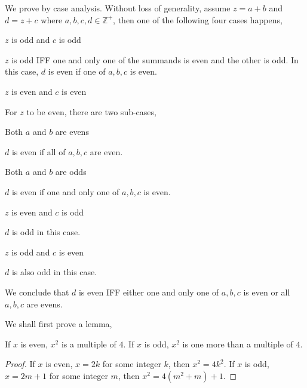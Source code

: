 \begin{pr}\leavevmode
    \begin{enumerate}[label=\textbf{(\alph*)}]
        \item We prove by case analysis. Without loss of generality, assume $z = a + b$
        and $d = z + c$ where $a,b,c,d \in \mathbb{Z}^{+}$, then
        one of the following four cases happens,

        \begin{casesp}
            \item $z$ is odd and $c$ is odd
            
            $z$ is odd IFF one and only one of the summands is even and the other is odd.
            In this case, $d$ is even if one of $a,b,c$ is even.

            \item $z$ is even and $c$ is even
            
            For $z$ to be even, there are two sub-cases,

            \begin{casesp}
                \item Both $a$ and $b$ are evens
                
                $d$ is even if all of $a,b,c$ are even.
                \item Both $a$ and $b$ are odds
                
                $d$ is even if one and only one of $a,b,c$ is even.
            \end{casesp}

            \item $z$ is even and $c$ is odd
            
            $d$ is odd in this case.

            \item $z$ is odd and $c$ is even
            
            $d$ is also odd in this case.
        \end{casesp}

        We conclude that $d$ is even IFF either one and only one of $a,b,c$
        is even or all $a,b,c$ are evens.

        \item We shall first prove a lemma,
        
        \begin{lemPr}
            If $x$ is even, $x^2$ is a multiple of $4$.
            If $x$ is odd, $x^2$ is one more than a multiple of $4$.
        \end{lemPr}
        \begin{proof}
            If $x$ is even, $x = 2k$ for some integer $k$, then $x^2 = 4k^2$.
            If $x$ is odd, $x = 2m + 1$ for some integer $m$, then $x^2 = 4(m^2 + m) + 1$.
        \end{proof}


\end{enumerate}
\end{pr}
